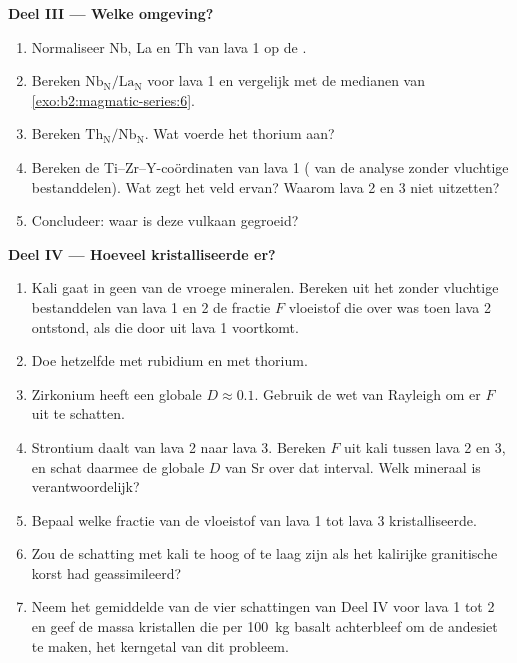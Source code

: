 \begin{problem}
\noindent\textbf{Deel III --- Welke omgeving?}
\begin{enumerate}[resume]
\item Normaliseer Nb, La en Th van lava 1 op de .
\item Bereken $\mathrm{Nb_N}/\mathrm{La_N}$ voor lava 1 en vergelijk met de medianen
van \cref{exo:b2:magmatic-series:6}.
\item Bereken $\mathrm{Th_N}/\mathrm{Nb_N}$. Wat voerde het thorium aan?
\item Bereken de Ti--Zr--Y-coördinaten van lava 1 ( van de analyse zonder vluchtige
bestanddelen). Wat zegt het veld ervan? Waarom lava 2 en 3 niet uitzetten?
\item Concludeer: waar is deze vulkaan gegroeid?
\end{enumerate}

\noindent\textbf{Deel IV --- Hoeveel kristalliseerde er?}
\begin{enumerate}[resume]
\item Kali gaat in geen van de vroege mineralen. Bereken uit het  zonder vluchtige bestanddelen van
lava 1 en 2 de fractie $F$ vloeistof die over was toen lava 2 ontstond, als die
door  uit lava 1 voortkomt.
\item Doe hetzelfde met rubidium en met thorium.
\item Zirkonium heeft een globale $D \approx 0.1$. Gebruik de wet van Rayleigh om er $F$
uit te schatten.
\item Strontium daalt van lava 2 naar lava 3. Bereken $F$ uit kali tussen lava 2 en
3, en schat daarmee de globale $D$ van Sr over dat interval. Welk mineraal is
verantwoordelijk?
\item Bepaal welke fractie van de vloeistof van lava 1 tot lava 3 kristalliseerde.
\item Zou de schatting met kali te hoog of te laag zijn als het  kalirijke granitische korst had
geassimileerd?
\item Neem het gemiddelde van de vier schattingen van Deel IV voor lava 1 tot 2 en geef de massa
kristallen die per \qty{100}{kg} basalt achterbleef om de andesiet te maken, het kerngetal
van dit probleem.
\end{enumerate}
\end{problem}
